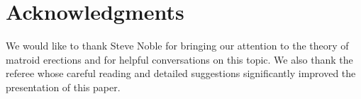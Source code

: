 \documentclass{daj}
\begin{document}
%
%
%

\section*{Acknowledgments} %
We would like to thank Steve Noble for bringing our attention to the theory of matroid erections and for helpful conversations on this topic. We also thank the referee whose careful reading and detailed suggestions significantly improved the presentation of this paper.
\end{document}
